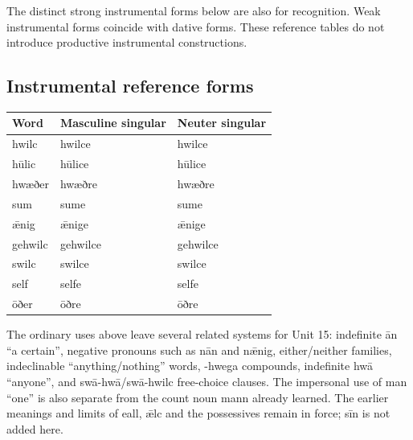 The distinct strong instrumental forms below are also for recognition. Weak instrumental forms coincide with dative forms. These reference tables do not introduce productive instrumental constructions.

\subsection*{Instrumental reference forms}

\par\begingroup
\fontsize{10.5}{13.2}\selectfont
\setlength{\LTleft}{0pt}\setlength{\LTright}{\fill}
\noindent
\begin{tabular}{@{}>{\raggedright\arraybackslash}p{34.61mm}>{\raggedright\arraybackslash}p{45.17mm}>{\raggedright\arraybackslash}p{38.59mm}@{}}
\toprule
\textbf{Word} & \textbf{Masculine singular} & \textbf{Neuter singular} \\
\midrule
hwilc & hwilce & hwilce \\
hūlic & hūlice & hūlice \\
hwæðer & hwæðre & hwæðre \\
sum & sume & sume \\
ǣnig & ǣnige & ǣnige \\
gehwilc & gehwilce & gehwilce \\
swilc & swilce & swilce \\
self & selfe & selfe \\
ōðer & ōðre & ōðre \\
\bottomrule
\end{tabular}
\par\endgroup

The ordinary uses above leave several related systems for Unit 15: indefinite ān “a certain”, negative pronouns such as nān and nǣnig, either/\allowbreak{}neither families, indeclinable “anything/\allowbreak{}nothing” words, -hwega compounds, indefinite hwā “anyone”, and swā-hwā/\allowbreak{}swā-hwilc free-choice clauses. The impersonal use of man “one” is also separate from the count noun mann already learned. The earlier meanings and limits of eall, ǣlc and the possessives remain in force; sīn is not added here.

